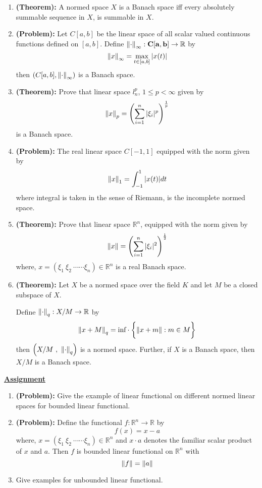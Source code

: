 \documentclass[a4paper,12pt]{article}
\begin{document}
    \begin{enumerate}
        \item {\bf (Theorem):} A normed space $X$ is a Banach space iff every absolutely summable sequence in $X$, is summable in $X$.
        \item  {\bf (Problem):} Let $C[a,b]$ be the linear space of all scalar valued continuous functions defined on $[a,b]$. Define $\mathbf{\norm{\cdot}_{\infty} : C[a,b] \to \mathbb{R}}$ by 
        \[\norm{x}_{\infty} = \displaystyle \max_{t \in [a,b]} |x(t)|\] 
        then $\left(C[a,b],\norm{\cdot}_{\infty}\right)$ is a Banach space.
        \item {\bf (Theorem):} Prove that linear space $l^{p}_n$, $1\leq p < \infty$ given by 
        \[\norm{x}_p = \left(\sum_{i=1}^{n}|\xi_i|^p\right)^{\frac{1}{p}}\] is a Banach space.
        \item {\bf (Problem):} The real linear space $C[-1,1]$ equipped with the norm given by 
        \[\norm{x}_1 = \int_{-1}^{1} |x(t)|dt\]
        where integral is taken in the sense of Riemann, is the incomplete normed space.
        \item {\bf (Theorem):} Prove that linear space $\mathbb{R}^n$, equipped with the norm given by 
        \[\norm{x} = \left(\sum_{i=1}^{n}|\xi_i|^2\right)^{\frac{1}{2}}\] where, $x = \left(\xi_1\ \xi_2\ \cdots \cdots\xi_n\right)\in \mathbb{R}^n$ is a real Banach space.
        \item {\bf (Theorem):} Let $X$ be a normed space over the field $K$ and let $M$ be a closed subspace of $X$.
        
        Define $\norm{\cdot}_q : X/M \to \mathbb{R}$ by 
        \[\norm{x+M}_q = \mbox{inf}\cdot \biggl\{\norm{x + m} : m\in M\biggr\}\]
        then $\left(X/M\  ,\ \norm{\cdot}_q \right)$ is a normed space. Further, if $X$ is a Banach space, then $X/M$ is a Banach space.
    \end{enumerate}

    \pagebreak

    \begin{center}
        \LARGE{{\underline{\bf Assignment }}}
    \end{center}

    \begin{enumerate}
        \item {\bf (Problem):} Give the example of linear functional on different normed linear spaces for bounded linear functional.
        \item {\bf (Problem):} Define the functional $f : \mathbb{R}^{n}\to \mathbb{R}$ by 
        \[f(x) = x - a\]
        where, $x = \left(\xi_1\ \xi_2\ \cdots \cdots\xi_n\right)\in \mathbb{R}^n$ and $x\cdot a$ denotes the familiar scalar product of $x$ and $a$. Then $f$ is bounded linear functional on $\mathbb{R}^n$ with
        \[\norm{f} = \norm{a}\] 
        \item Give examples for unbounded linear functional.
    \end{enumerate}\
\end{document}
